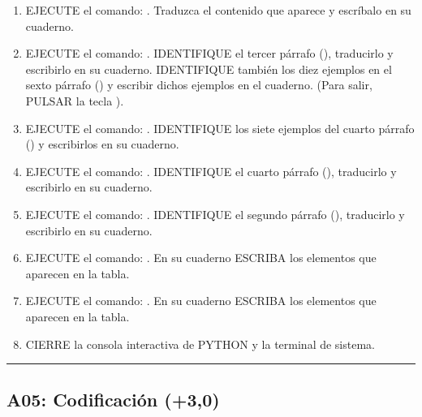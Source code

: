 \documentclass[letterpaper,10pt,spanish]{sphinxmanual}
\begin{document}
\begin{enumerate}
\item {} 
\sphinxAtStartPar
EJECUTE el comando: . Traduzca el contenido que aparece y escríbalo en su cuaderno.

\item {} 
\sphinxAtStartPar
EJECUTE el comando: . IDENTIFIQUE el tercer párrafo (), traducirlo y escribirlo en su cuaderno. IDENTIFIQUE también los diez ejemplos en el sexto párrafo () y escribir dichos ejemplos en el cuaderno. (Para salir, PULSAR la tecla ).

\item {} 
\sphinxAtStartPar
EJECUTE el comando: . IDENTIFIQUE los siete ejemplos del cuarto párrafo () y escribirlos en su cuaderno.

\item {} 
\sphinxAtStartPar
EJECUTE el comando: . IDENTIFIQUE el cuarto párrafo (), traducirlo y escribirlo en su cuaderno.

\item {} 
\sphinxAtStartPar
EJECUTE el comando: . IDENTIFIQUE el segundo párrafo (), traducirlo y escribirlo en su cuaderno.

\item {} 
\sphinxAtStartPar
EJECUTE el comando: . En su cuaderno ESCRIBA los elementos que aparecen en la tabla.

\item {} 
\sphinxAtStartPar
EJECUTE el comando: . En su cuaderno ESCRIBA los elementos que aparecen en la tabla.

\item {} 
\sphinxAtStartPar
CIERRE la consola interactiva de PYTHON y la terminal de sistema.

\end{enumerate}


\bigskip\hrule\bigskip



\subsection{A05: Codificación (+3,0)}
\label{\detokenize{1_guias/10programacion/G1024:a05-codificacion-3-0}}
\sphinxAtStartPar
{}
\end{document}
